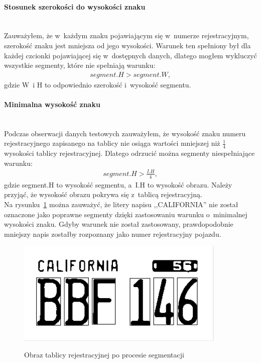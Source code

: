 \paragraph{Stosunek szerokości do wysokości znaku}\mbox{}\\
Zauważyłem, że w~każdym znaku pojawiającym się w~numerze rejestracyjnym, szerokość znaku jest mniejsza od jego wysokości. Warunek ten spełniony był dla każdej czcionki pojawiającej się w~dostępnych danych, dlatego mogłem wykluczyć wszystkie segmenty, które nie spełniają warunku:
\begin{gather*}
  segment.H > segment.W,
\end{gather*}
gdzie W~i H to odpowiednio szerokość i~wysokość segmentu.

\paragraph{Minimalna wysokość znaku}\mbox{}\\
Podczas obserwacji danych testowych zauważyłem, że wysokość znaku numeru rejestracyjnego zapisanego na tablicy nie osiąga wartości mniejszej niż $\frac{1}{4}$ wysokości tablicy rejestracyjnej. Dlatego odrzucić można segmenty niespełniające warunku:
\begin{gather*}
  segment.H > \frac{I.H}{4},
\end{gather*}
gdzie segment.H to wysokość segmentu, a~I.H to wysokość obrazu. Należy przyjąć, że wysokość obrazu pokrywa się z~tablicą rejestracyjną.\\
Na rysunku~\ref{fig:min_height_condition} można zauważyć, że litery napisu ,,CALIFORNIA'' nie został oznaczone jako poprawne segmenty dzięki zastosowaniu warunku o~minimalnej wysokości znaku. Gdyby warunek nie został zastosowany, prawdopodobnie mniejszy napis zostałby rozpoznany jako numer rejestracyjny pojazdu.

\begin{figure}
  \centering
  \includegraphics[width=10cm]{img/min-height-condition-output}
  \label{fig:detect_bg_bad_input}
  \caption{Obraz tablicy rejestracyjnej po procesie segmentacji}
  \label{fig:min_height_condition}
\end{figure}

